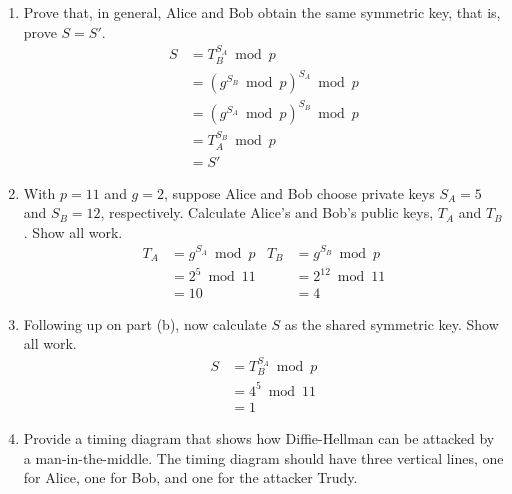 \documentclass[12pt]{article}
\begin{document}
\begin{enumerate}
		\begin{enumerate}
			\item Prove that, in general, Alice and Bob obtain the same symmetric key, that is, prove \(S=S'\).
			\color{CrispBlue}
			\begin{align*}
				S&=T_B^{S_A}\bmod{p}\\
				&=\left(g^{S_B}\bmod{p}\right)^{S_A}\bmod{p}\\
				&=\left(g^{S_A}\bmod{p}\right)^{S_B}\bmod{p}\\
				&=T_A^{S_B}\bmod{p}\\
				&=S'
			\end{align*}\color{black}\vspace{-1em}
			\item With \(p=11\) and \(g=2\), suppose Alice and Bob choose private keys \(S_A=5\) and \(S_B=12\), respectively. Calculate Alice’s and Bob’s public keys, \(T_A\) and \(T_B\). Show all work.
			\color{CrispBlue}
			\begin{align*}
				T_A&=g^{S_A}\bmod{p}	&T_B&=g^{S_B}\bmod{p}\\
				&=2^5\bmod{11}			&&=2^{12}\bmod{11}\\
				&=10					&&=4
			\end{align*}\color{black}
			\item Following up on part (b), now calculate \(S\) as the shared symmetric key. Show all work.
			\color{CrispBlue}
			\begin{align*}
				S&=T_B^{S_A}\bmod{p}\\
				&=4^{5}\bmod{11}\\
				&=1
			\end{align*}\color{black}\vspace{-1em}
			\item Provide a timing diagram that shows how Diffie-Hellman can be attacked by a man-in-the-middle. The timing diagram should have three vertical lines, one for Alice, one for Bob, and one for the attacker Trudy.
			\color{CrispBlue}\begin{center}
\end{center}
\end{enumerate}
\end{enumerate}
\end{document}
